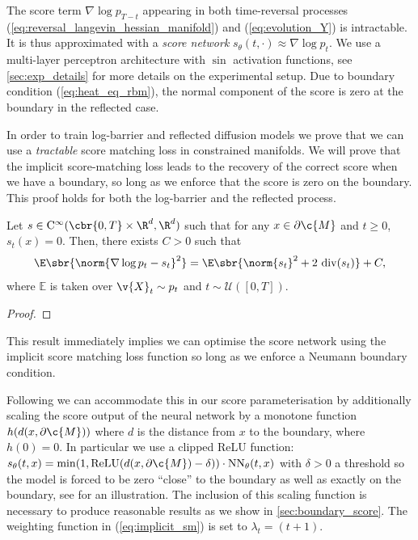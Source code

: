 The score term \(\nabla \log p_{T-t}\) appearing in both time-reversal processes (\ref{eq:reversal_langevin_hessian_manifold}) and (\ref{eq:evolution_Y}) is intractable.
It is thus approximated with a \emph{score network} \(s_\theta(t, \cdot) \approx \nabla \log p_t\).
We use a multi-layer perceptron architecture with \(\sin\) activation functions, see \cref{sec:exp_details} for more details on the experimental setup.
Due to boundary condition (\ref{eq:heat_eq_rbm}), the normal component of the score is zero at the boundary in the reflected case.

In order to train log-barrier and reflected diffusion models we prove that we can use a \emph{tractable} score matching loss in constrained manifolds.
We will prove that the implicit score-matching loss leads to the recovery of the correct score when we have a boundary, so long as we enforce that the score is zero on the boundary.
This proof holds for both the log-barrier and the reflected process.

\begin{proposition}
	\label{thm:implicit_score_matching_boundary}
	Let \(s \in \mathrm{C}^\infty(\cbr{0,T} \times \R^d, \R^d)\) such that for any \(x \in \partial \c{M}\) and \(t \geq 0\), \(s_t(x) =0\).
	Then, there exists \(C >0\) such that \begin{equation} {\E\sbr{\norm{\nabla \log p_t - s_t}^2} = \E\sbr{\norm{s_t}^2 + 2~ \mathrm{div}(s_t)}} + C , \end{equation} where \(\mathbb{E}\) is taken over \(\v{X}_t \sim p_t\) and \(t \sim \mathcal{U}([0,T])\).
\end{proposition}
\begin{proof}
\end{proof}
This result immediately implies we can optimise the score network using the implicit score matching loss function so long as we enforce a Neumann boundary condition.

Following \cite{liu2022estimating} we can accommodate this in our score parameterisation by additionally scaling the score output of the neural network by a monotone function \(h(d(x, \partial \c{M}))\) where \(d\) is the distance from \(x\) to the boundary, where \(h(0) = 0\).
In particular we use a clipped ReLU function: \(s_\theta(t, x) = \min(1, \textrm{ReLU}(d(x, \partial \c{M}) - \delta)) \cdot \textrm{NN}_\theta(t, x)\) with \(\delta>0\) a threshold so the model is forced to be zero ``close'' to the boundary as well as exactly on the boundary, see  for an illustration.
The inclusion of this scaling function is necessary to produce reasonable results as we show in \cref{sec:boundary_score}. The weighting function in (\ref{eq:implicit_sm}) is set to \(\lambda_t = (t + 1)\).

